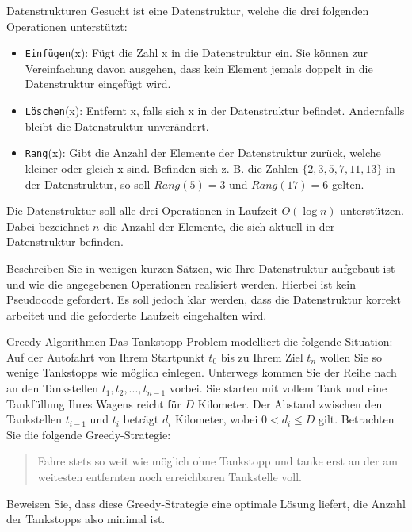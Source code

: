 \documentclass{article}
\begin{document}
\begin{exercise}{Datenstrukturen}
  Gesucht ist eine Datenstruktur, welche die drei folgenden Operationen unterstützt:
  \begin{itemize}
    \item \texttt{Einfügen}(x): Fügt die Zahl x in die Datenstruktur ein. Sie können zur Vereinfachung davon ausgehen, dass kein Element jemals doppelt in die Datenstruktur eingefügt wird.
    \item \texttt{Löschen}(x): Entfernt x, falls sich x in der Datenstruktur befindet. Andernfalls bleibt die Datenstruktur unverändert.
    \item \texttt{Rang}(x): Gibt die Anzahl der Elemente der Datenstruktur zurück, welche kleiner oder gleich x sind. Befinden sich z. B. die Zahlen $\{2,3,5,7,11,13\}$ in der Datenstruktur, so soll $Rang(5) = 3$ und $Rang(17) = 6$ gelten.
  \end{itemize}
  Die Datenstruktur soll alle drei Operationen in Laufzeit $O(\log n)$ unterstützen. Dabei bezeichnet $n$ die Anzahl der Elemente, die sich aktuell in der Datenstruktur befinden.\par
  Beschreiben Sie in wenigen kurzen Sätzen, wie Ihre Datenstruktur aufgebaut ist und wie die angegebenen Operationen realisiert werden. Hierbei ist kein Pseudocode gefordert. Es soll jedoch klar werden, dass die Datenstruktur korrekt arbeitet und die geforderte Laufzeit eingehalten wird.

  \begin{solution}

  \end{solution}
\end{exercise}

\begin{exercise}{Greedy-Algorithmen}
  Das Tankstopp-Problem modelliert die folgende Situation: Auf der Autofahrt von Ihrem Startpunkt $t_0$ bis zu Ihrem Ziel $t_n$ wollen Sie so wenige Tankstopps wie möglich einlegen. Unterwegs kommen Sie der Reihe nach an den Tankstellen $t_1,t_2,...,t_{n-1}$ vorbei. Sie starten mit vollem Tank und eine Tankfüllung Ihres Wagens reicht für $D$ Kilometer. Der Abstand zwischen den Tankstellen $t_{i-1}$ und $t_i$ beträgt $d_i$ Kilometer, wobei $0 < d_i \leq D$ gilt. Betrachten Sie die folgende Greedy-Strategie:
  \begin{quote}
    Fahre stets so weit wie möglich ohne Tankstopp und tanke erst an der am weitesten entfernten noch erreichbaren Tankstelle voll.
  \end{quote}
  Beweisen Sie, dass diese Greedy-Strategie eine optimale Lösung liefert, die Anzahl der Tankstopps also minimal ist.

  \begin{solution}

  \end{solution}
\end{exercise}
\end{document}

